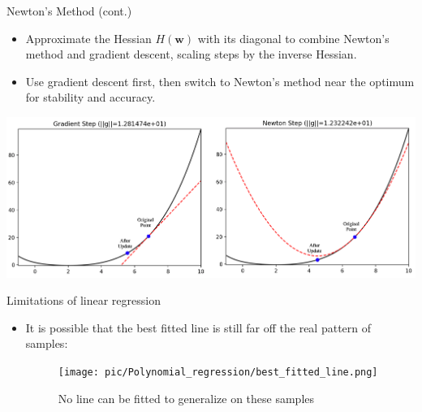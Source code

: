 \documentclass[serif, aspectratio=169]{beamer}
\begin{document}
\begin{frame}{Newton's Method (cont.)}
\begin{itemize}
    \item Approximate the Hessian $H(\mathbf{w})$ with its diagonal to combine Newton's method and gradient descent, scaling steps by the inverse Hessian.
    \item Use gradient descent first, then switch to Newton's method near the optimum for stability and accuracy.
\end{itemize}
 \centering
    \includegraphics[width=0.7\linewidth]{pic/newton.png}
\end{frame}


\begin{frame}{Limitations of linear regression}
    \begin{itemize}
        \item It is possible that the best fitted line is still far off the real pattern of samples:
        \begin{figure}[h]
            \centering
            \texttt{[image: pic/Polynomial\_regression/best\_fitted\_line.png]}
            \caption{No line can be fitted to generalize on these samples}
        \end{figure}
    \end{itemize}
\end{frame}
\end{document}
